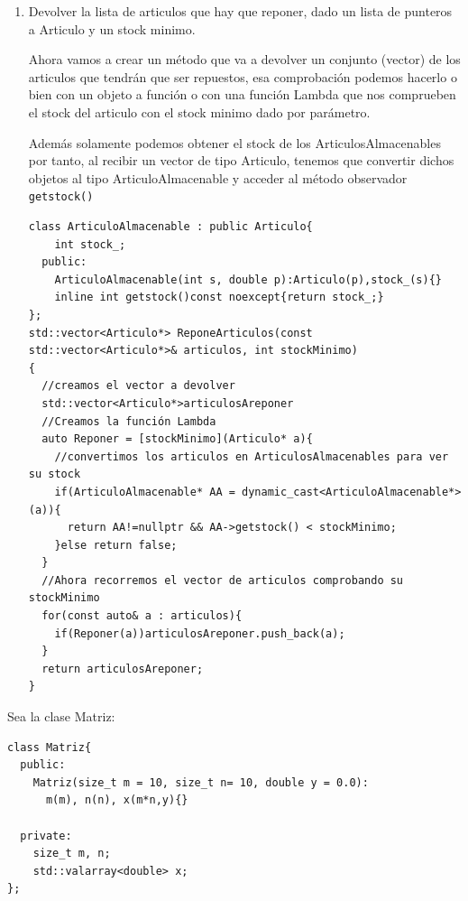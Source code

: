 \begin{enumerate}
  \item Devolver la lista de articulos que hay que reponer, dado un lista de punteros a Articulo y un stock minimo.

  Ahora vamos a crear un método que va a devolver un conjunto (vector) de los articulos que tendrán que ser repuestos, esa comprobación podemos hacerlo o bien con un objeto a función o con una función Lambda que nos comprueben el stock del articulo con el stock minimo dado por parámetro.

  Además solamente podemos obtener el stock de los ArticulosAlmacenables por tanto, al recibir un vector de tipo Articulo, tenemos que convertir dichos objetos al tipo ArticuloAlmacenable y acceder al método observador \texttt{getstock()}

\begin{verbatim}
class ArticuloAlmacenable : public Articulo{
    int stock_;
  public:
    ArticuloAlmacenable(int s, double p):Articulo(p),stock_(s){}
    inline int getstock()const noexcept{return stock_;}
};
std::vector<Articulo*> ReponeArticulos(const std::vector<Articulo*>& articulos, int stockMinimo)
{
  //creamos el vector a devolver
  std::vector<Articulo*>articulosAreponer
  //Creamos la función Lambda
  auto Reponer = [stockMinimo](Articulo* a){
    //convertimos los articulos en ArticulosAlmacenables para ver su stock
    if(ArticuloAlmacenable* AA = dynamic_cast<ArticuloAlmacenable*>(a)){
      return AA!=nullptr && AA->getstock() < stockMinimo;
    }else return false;
  }
  //Ahora recorremos el vector de articulos comprobando su stockMinimo
  for(const auto& a : articulos){
    if(Reponer(a))articulosAreponer.push_back(a);
  }
  return articulosAreponer;
}
\end{verbatim}
\end{enumerate}
 Sea la clase Matriz:
\begin{center}
  \begin{lstlisting}[frame = single]
class Matriz{
  public:
    Matriz(size_t m = 10, size_t n= 10, double y = 0.0): 
      m(m), n(n), x(m*n,y){}

  private:
    size_t m, n;
    std::valarray<double> x;
};
  \end{lstlisting}
\end{center}

